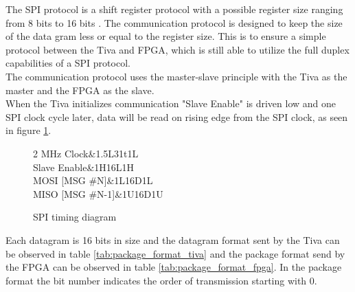 \documentclass[../../../main]{subfiles}
\begin{document}
The SPI protocol is a shift register protocol with a possible register size ranging from 8 bits to 16 bits \cite[sec.15]{tiva_data}.
The communication protocol is designed to keep the size of the data gram less or equal to the register size. This is to ensure a simple protocol between the Tiva and FPGA, which is still able to utilize the full duplex capabilities of a SPI protocol. \\
The communication protocol uses the master-slave principle with the Tiva as the master and the FPGA as the slave.\\
When the Tiva initializes communication "Slave Enable" is driven low and one SPI clock cycle later,
data will be read on rising edge from the SPI clock, as seen in figure \ref{fig:spi_timing_diagram}.
\\

\begin{figure}[h]
	\center
\begin{tikztimingtable}[timing/font=\normalfont]
	{2 MHz Clock}&1.5L31{t}1L\\
	{Slave Enable}&1H16L1H\\
	{MOSI [MSG \#N]}&1L16{D{}}1L\\
	{MISO [MSG \#N-1]}&1U16{D{}}1U\\
\end{tikztimingtable}
\caption{SPI timing diagram}
\label{fig:spi_timing_diagram}
\end{figure}

Each datagram is 16 bits in size and the datagram format sent by the Tiva
can be observed in table \ref{tab:package_format_tiva} and the package format send by the FPGA
can be observed in table \ref{tab:package_format_fpga}.
In the package format the bit number indicates the order of transmission starting with 0.
\end{document}
